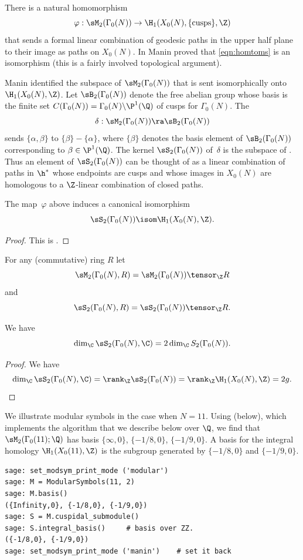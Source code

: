 There is a natural homomorphism 
\begin{equation}\label{eqn:homtoms}
  \varphi: \sM_2(\Gamma_0(N)) \to \H_1(X_0(N),\{\text{cusps}\},\Z)
\end{equation}
that sends a formal linear combination of geodesic paths in the upper
half plane to their image as paths on $X_0(N)$.  In
\cite{manin:parabolic} Manin proved that \eqref{eqn:homtoms} is an
isomorphism (this is a fairly involved topological argument).  

Manin identified the subspace of $\sM_2(\Gamma_0(N))$ that is
sent isomorphically onto $\H_1(X_0(N),\Z)$.  Let $\sB_2(\Gamma_0(N))$
denote the free abelian group whose basis is the finite set
$C(\Gamma_0(N)) = \Gamma_0(N)\backslash \P^1(\Q)$ of cusps for
$\Gamma_0(N)$.  The 
$$\delta: \sM_2(\Gamma_0(N))\ra \sB_2(\Gamma_0(N))$$ sends
$\{\alpha,\beta\}$ to $\{\beta\}-\{\alpha\}$, where $\{\beta\}$ denotes the
basis element of $\sB_2(\Gamma_0(N))$ corresponding to
$\beta\in\P^1(\Q)$.  The kernel $\sS_2(\Gamma_0(N))$ of~$\delta$ is
the subspace of .  Thus an element of
$\sS_2(\Gamma_0(N))$ can be thought of as a linear combination of
paths in $\h^*$ whose endpoints are cusps and whose images in
$X_0(N)$ are homologous to a $\Z$-linear combination of closed
paths.
\begin{theorem}[Manin]
The map~$\varphi$ above induces a canonical isomorphism 
   $$\sS_2(\Gamma_0(N)) \isom \H_1(X_0(N),\Z).$$
\end{theorem}
\begin{proof}
This is \cite[Thm.~1.9]{manin:parabolic}.
\end{proof}
For any (commutative) ring $R$ let 
$$
  \sM_2(\Gamma_0(N), R) = \sM_2(\Gamma_0(N)) \tensor_\Z R
$$
and 
$$
  \sS_2(\Gamma_0(N), R) = \sS_2(\Gamma_0(N)) \tensor_\Z R.
$$
\begin{proposition}\label{prop:dimsym2}
We have 
$$
  \dim_\C\sS_2(\Gamma_0(N),\C) = 2\dim_\C S_2(\Gamma_0(N)).
$$
\end{proposition}
\begin{proof}
We have
 $$\dim_\C\sS_2(\Gamma_0(N),\C) = \rank_\Z \sS_2(\Gamma_0(N)) = 
 \rank_\Z \H_1(X_0(N),\Z) = 2g.$$
\end{proof}

\begin{example}  
  We illustrate modular symbols in the case when $N=11$.  
  Using \sage{} (below),
  which implements the algorithm that we describe below
  over $\Q$, we find that $\sM_2(\Gamma_0(11);\Q)$ has basis
  $\{\infty,0\}$, $\{-1/8,0\}$, $\{-1/9,0\}$.  
A basis for the integral homology $\H_1(X_0(11),\Z)$ is the
subgroup generated by $\{-1/8,0\}$ and $\{-1/9,0\}$.
\begin{verbatim}
sage: set_modsym_print_mode ('modular')
sage: M = ModularSymbols(11, 2)
sage: M.basis()
({Infinity,0}, {-1/8,0}, {-1/9,0})
sage: S = M.cuspidal_submodule()
sage: S.integral_basis()     # basis over ZZ.
({-1/8,0}, {-1/9,0})
sage: set_modsym_print_mode ('manin')    # set it back
\end{verbatim}

\end{example}

